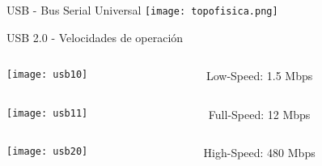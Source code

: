 \begin{frame}{USB - Bus Serial Universal}
	\centering
	\texttt{[image: topofisica.png]}
\end{frame}


\begin{frame}{USB 2.0 - Velocidades de operación}
	\centering
	\begin{columns}
		\begin{column}{.3\textwidth}
			\texttt{[image: usb10]}
		\end{column}
		\begin{column}{.6\textwidth}
			\huge{Low-Speed: 1.5 Mbps} 
		\end{column}
	\end{columns}
	\hfill
	\begin{columns}
		\begin{column}{.3\textwidth}
			\texttt{[image: usb11]}
		\end{column}
		\begin{column}{.6\textwidth}
			\huge{Full-Speed: 12 Mbps} 
		\end{column}
	\end{columns}
	\hfill
	\begin{columns}
		\begin{column}{.3\textwidth}
			\texttt{[image: usb20]}
		\end{column}
		\begin{column}{.6\textwidth}
			\huge{High-Speed: 480 Mbps} 
		\end{column}
	\end{columns}	
\end{frame}

